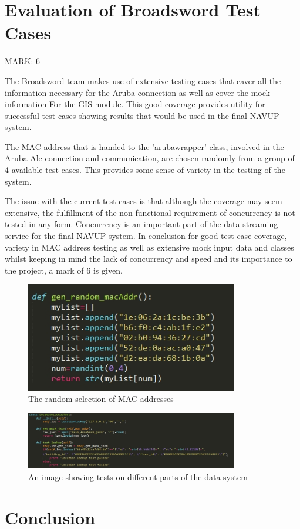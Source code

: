 \documentclass{article}
\begin{document}
\section{Evaluation of Broadsword Test Cases}
\begin{flushleft}
MARK: 6
\end{flushleft}

\begin{flushleft}
The Broadsword team makes use of extensive testing cases that caver all the information necessary for the Aruba connection as well as cover the mock information For the GIS module. This good coverage provides utility for successful test cases showing results that would be used in the final NAVUP system. 
\end{flushleft}

\begin{flushleft}
The MAC address that is handed to the 'aruba\textunderscore wrapper' class, involved in the Aruba Ale connection and communication, are chosen randomly from a group of 4 available test cases. This provides some sense of variety in the testing of the system. 
\end{flushleft}

\begin{flushleft}
The issue with the current test cases is that although the coverage may seem extensive, the fulfillment of the non-functional requirement of concurrency is not tested in any form. Concurrency is an important part of the data streaming service for the final NAVUP system. In conclusion for good test-case coverage, variety in MAC address testing as well as extensive mock input data and classes whilst keeping in mind the lack of concurrency and speed and its importance to the project, a mark of 6 is given.
\end{flushleft}


\begin{figure}[ht]
  \includegraphics[width=350px]{Images/MAC.jpg}
  \caption{The random selection of MAC addresses}
  \label{The random selection of MAC addresses}  
\end{figure}

\begin{figure}[ht]
  \includegraphics[width=350px]{Images/Mock.jpg}
  \caption{An image showing tests on different parts of the data system}
  \label{An image showing test date to test different part of the data system}  
\end{figure}

\section{Conclusion}
\end{document}
